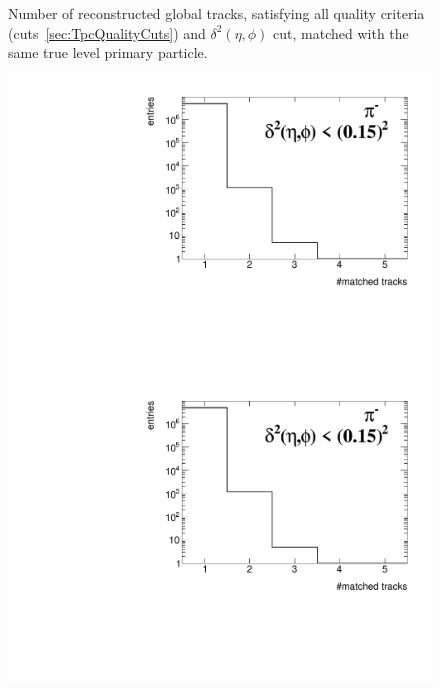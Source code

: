 \begin{figure}[ht]
{	}%
	\caption[Number of reconstructed global tracks, satisfying all quality criteria and $\delta^{2}\left(\eta,\phi\right)$ cut, matched with the same true level primary particle.]{Number of reconstructed global tracks, satisfying all quality criteria (cuts~\ref{sec:TpcQualityCuts}) and $\delta^{2}\left(\eta,\phi\right)$ cut, matched with the same true level primary particle.}\label{fig:trackSplittingetaPhi}
\end{figure}


\begin{figure}[h!]%
	\centering
	\parbox{0.48\textwidth}{
		\centering
		\includegraphics[width=\linewidth,page=21]{graphics/eff/trackSplitting_QualityEtaPhiCD.pdf}\\
		\includegraphics[width=\linewidth,page=22]{graphics/eff/trackSplitting_QualityEtaPhiCD.pdf}\\
}
\end{figure}
